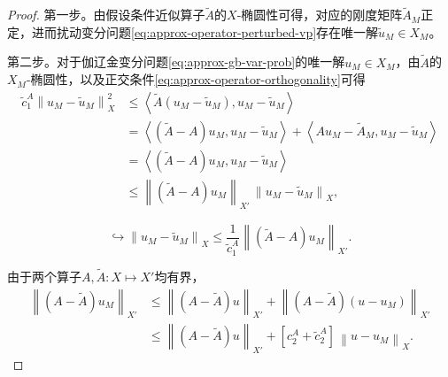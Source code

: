 \begin{proof}
  第一步。由假设条件近似算子$\widetilde{A}$的$X$-椭圆性可得，对应的刚度矩阵$\widetilde{A}_{M}$正定，进而扰动变分问题\eqref{eq:approx-operator-perturbed-vp}存在唯一解$\tilde{u}_{M} \in X_{M}$。

  第二步。对于伽辽金变分问题\eqref{eq:approx-gb-var-prob}的唯一解$u_{M} \in X_{M}$，由$\widetilde{A}$的$X_{M}$-椭圆性，以及正交条件\eqref{eq:approx-operator-orthogonality}可得
  \begin{equation*}
    \begin{split}
      \tilde{c}_{1}^{A} \left\| u_{M} - \tilde{u}_{M} \right\|_{X}^{2}
      & \le \left\langle \widetilde{A} \left( u_{M} - \tilde{u}_{M} \right), u_{M} - \tilde{u}_{M} \right\rangle \\
      & = \left\langle
      \left( \widetilde{A} - A \right) u_{M},
      u_{M} - \tilde{u}_{M}
      \right\rangle +
      \left\langle
      A u_{M} - \widetilde{A}_{M},
      u_{M} - \tilde{u}_{M}
      \right\rangle \\
      & = \left\langle \left( \widetilde{A} - A \right) u_{M},
      u_{M} - \tilde{u}_{M}
      \right\rangle \\
      & \le \left\| \left( \widetilde{A} - A \right) u_{M} \right\|_{X'} \, \left\| u_{M} - \tilde{u}_{M} \right\|_{X},
    \end{split}
  \end{equation*}

  \begin{equation*}
    \hookrightarrow \left\| u_{M} - \tilde{u}_{M} \right\|_{X}
    \le \frac{1}{\tilde{c}_{1}^{A}} \left\| \left( \widetilde{A} - A \right) u_{M} \right\|_{X'}.
  \end{equation*}

  由于两个算子$A, \widetilde{A} : X \mapsto X'$均有界，
  \begin{equation*}
    \begin{split}
      \left\| \left( A - \widetilde{A} \right) u_{M} \right\|_{X'}
      & \le \left\| \left( A - \widetilde{A} \right) u \right\|_{X'}
      + \left\| \left( A  - \widetilde{A} \right) \left( u - u_{M} \right) \right\|_{X'} \\
      & \le \left\| \left( A - \widetilde{A} \right) u \right\|_{X'}
      + \left[ c_{2}^{A} + \tilde{c}_{2}^{A} \right] \, \left\| u - u_{M} \right\|_{X}.
    \end{split}
  \end{equation*}


\end{proof}

